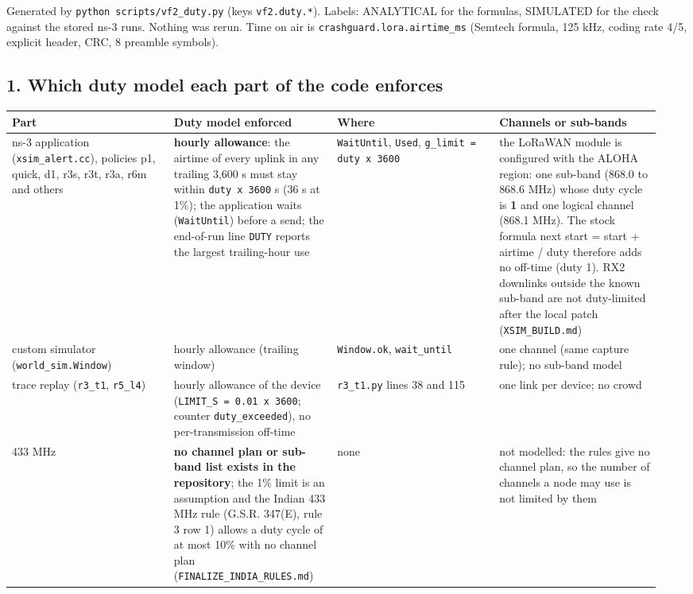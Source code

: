 


Generated by \texttt{python scripts/vf2\_duty.py} (keys \texttt{vf2.duty.*}). Labels: ANALYTICAL for the formulas, SIMULATED for the check against the stored ns-3 runs. Nothing was rerun. Time on air is \texttt{crashguard.lora.airtime\_ms} (Semtech formula, 125 kHz, coding rate 4/5, explicit header, CRC, 8 preamble symbols).

\subsection*{1. Which duty model each part of the code enforces}

{\scriptsize\raggedright
\begin{longtable}{p{0.237\linewidth}p{0.237\linewidth}p{0.237\linewidth}p{0.237\linewidth}}
\toprule
Part & Duty model enforced & Where & Channels or sub-bands \\
\midrule
\endhead
ns-3 application (\texttt{xsim\_alert.cc}), policies p1, quick, d1, r3s, r3t, r3a, r6m and others & \textbf{hourly allowance}: the airtime of every uplink in any trailing 3,600 s must stay within \texttt{duty x 3600} s (36 s at 1\%); the application waits (\texttt{WaitUntil}) before a send; the end-of-run line \texttt{DUTY} reports the largest trailing-hour use & \texttt{WaitUntil}, \texttt{Used}, \texttt{g\_limit = duty x 3600} & the LoRaWAN module is configured with the ALOHA region: one sub-band (868.0 to 868.6 MHz) whose duty cycle is \textbf{1} and one logical channel (868.1 MHz). The stock formula next start = start + airtime / duty therefore adds no off-time (duty 1). RX2 downlinks outside the known sub-band are not duty-limited after the local patch (\texttt{XSIM\_BUILD.md}) \\
custom simulator (\texttt{world\_sim.Window}) & hourly allowance (trailing window) & \texttt{Window.ok}, \texttt{wait\_until} & one channel (same capture rule); no sub-band model \\
trace replay (\texttt{r3\_t1}, \texttt{r5\_l4}) & hourly allowance of the device (\texttt{LIMIT\_S = 0.01 x 3600}; counter \texttt{duty\_exceeded}), no per-transmission off-time & \texttt{r3\_t1.py} lines 38 and 115 & one link per device; no crowd \\
433 MHz & \textbf{no channel plan or sub-band list exists in the repository}; the 1\% limit is an assumption and the Indian 433 MHz rule (G.S.R. 347(E), rule 3 row 1) allows a duty cycle of at most 10\% with no channel plan (\texttt{FINALIZE\_INDIA\_RULES.md}) & none & not modelled: the rules give no channel plan, so the number of channels a node may use is not limited by them \\
\bottomrule
\end{longtable}}


